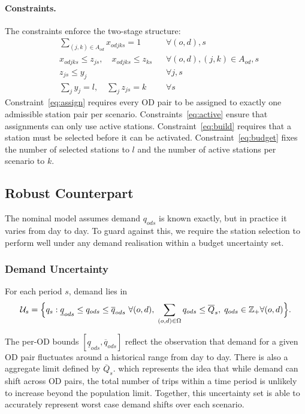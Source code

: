 \documentclass[11pt]{article}
\newcommand{\cU}{\mathcal{U}}
\theoremstyle{definition}
\begin{document}
\paragraph{Constraints.}
The constraints enforce the two-stage structure:
\begin{align}
	 & \sum_{(j,k)\in A_{od}} x_{odjks} = 1             &  & \forall (o,d), s \label{eq:assign} \\
	 & x_{odjks} \le z_{js}, \quad x_{odjks} \le z_{ks} &  & \forall (o,d), (j,k)\in A_{od}, s
	\label{eq:active}                                                                           \\
	 & z_{js} \le y_j                                   &  & \forall j, s \label{eq:build}      \\
	 & \sum_j y_j = l, \quad \sum_j z_{js} = k          &  & \forall s \label{eq:budget}
\end{align}
Constraint~\eqref{eq:assign} requires every OD pair to be assigned to exactly
one admissible station pair per scenario. Constraints~\eqref{eq:active} ensure
that assignments can only use active stations. Constraint~\eqref{eq:build}
requires that a station must be selected before it can be activated.
Constraint~\eqref{eq:budget} fixes the number of selected stations to $l$ and the
number of active stations per scenario to $k$.

\subsection{Robust Counterpart}

The nominal model assumes demand $q_{ods}$ is known exactly, but in practice it varies from day to day. To guard against this, we require the station selection to perform well under any demand realisation within a budget uncertainty set.

\subsubsection{Demand Uncertainty}

For each period $s$, demand lies in
\begin{equation}
	\cU_s = \Bigl\{
	q_s :
	\underline{q}_{ods} \le q_{ods} \le \overline{q}_{ods}\ \forall (o,d),\;
	\sum_{(o,d)\in\Omega} q_{ods} \le \overline{Q}_s, \; q_{ods} \in \mathbb{Z}_{+} \forall (o, d)
	\Bigr\}.
	\label{eq:uset}
\end{equation}

The per-OD bounds $[\underline{q}_{ods}, \overline{q}_{ods}]$ reflect the
observation that demand for a given OD pair fluctuates around a historical
range from day to day. There is also a aggregate limit defined by $\overline{Q}_s.$ which represents the idea that while demand can shift across OD pairs, the total number of trips within a time period is unlikely to increase beyond the population limit. Together, this uncertainty set is able to accurately represent worst case demand shifts over each scenario.
\end{document}
